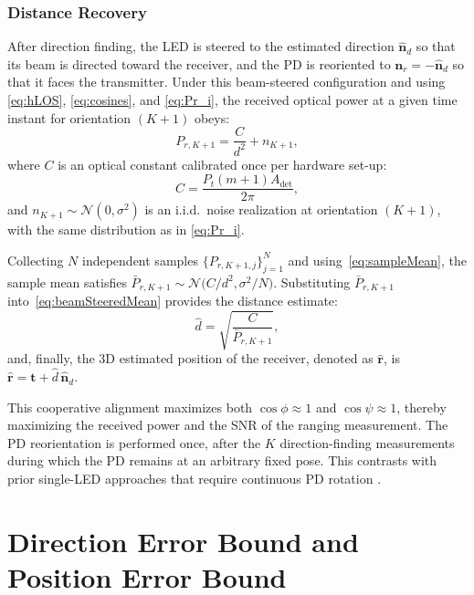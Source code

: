 \documentclass[journal]{IEEEtran}
\begin{document}
\subsubsection{Distance Recovery}

After direction finding, the LED is steered to the estimated direction $\hat{\mathbf{n}}_{d}$ so that its beam is directed toward the receiver, and the PD is reoriented to $\mathbf{n}_r = -\hat{\mathbf{n}}_d$ so that it faces the transmitter. Under this beam-steered configuration and using \eqref{eq:hLOS}, \eqref{eq:cosines}, and \eqref{eq:Pr_i}, the received optical power at a given time instant for orientation $(K+1)$ obeys:
\begin{equation}
P_{r,K+1}= \frac{C}{d^{2}}+n_{K+1},
\label{eq:beamSteeredMean}
\end{equation}
where \(C\) is an optical constant calibrated once per hardware set-up:
\begin{equation}
C = \frac{P_{t}(m+1)A_{\text{det}}}{2\pi},
\label{eq:constant_C}
\end{equation} 
and $n_{K+1}\sim\mathcal{N}(0,\sigma^{2})$ is an i.i.d.\ noise realization at orientation $(K+1)$, with the same distribution as in \eqref{eq:Pr_i}.

Collecting \(N\) independent samples \(\{P_{r,K+1,j}\}_{j=1}^{N}\) and using~\eqref{eq:sampleMean}, the sample mean satisfies \(\bar P_{r,K+1}\sim\mathcal{N}\bigl(C/d^{2},\sigma^{2}/N\bigr)\). Substituting \(\bar P_{r,K+1}\) into~\eqref{eq:beamSteeredMean} provides the distance estimate:
\begin{equation}
\hat d = \sqrt{\frac{C}{\bar P_{r,K+1}}},
\label{eq:dhat}
\end{equation}
and, finally, the 3D estimated position of the receiver, denoted as \(\hat{\mathbf{r}}\), is $\hat{\mathbf{r}} = \mathbf{t} + \hat d \,\hat{\mathbf{n}}_{d}$.

This cooperative alignment maximizes both $\cos\phi\approx 1$ and $\cos\psi\approx 1$, thereby maximizing the received power and the SNR of the ranging measurement. The PD reorientation is performed once, after the $K$ direction-finding measurements during which the PD remains at an arbitrary fixed pose. This contrasts with prior single-LED approaches that require continuous PD rotation \cite{Liu2022,Wang2024,Shi2025}.

\section{Direction Error Bound and Position Error Bound}
\label{sec:PEB}
\end{document}
